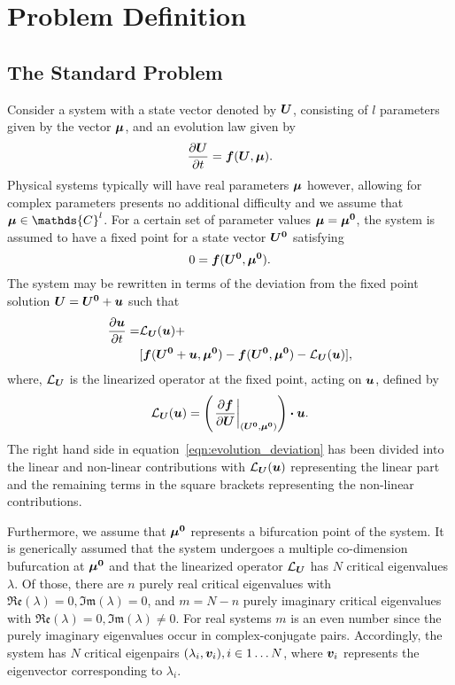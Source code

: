 \section{Problem Definition}
\label{sec:problem_setup}

\subsection{The Standard Problem}
\label{sec:standard}

Consider a system with a state vector denoted by $\boldsymbol{U}$, consisting of $l$ parameters given by the vector $\boldsymbol{\mu}$, and an evolution law given by 
\begin{equation}
	\frac{\partial \boldsymbol{U}}{\partial t} = \boldsymbol{f}(\boldsymbol{U},\boldsymbol{\mu}).
	\label{eqn:evolution0}
\end{equation}
Physical systems typically will have real parameters $\boldsymbol{\mu}$ however, allowing for complex parameters presents no additional difficulty and we assume that $\vecmu \in \mathds{C}^{l}$. 
For a certain set of parameter values $\boldsymbol{\mu} = \boldsymbol{\mu^{0}}$, the system is assumed to have a fixed point for a state vector $\boldsymbol{U^{0}}$ satisfying
\begin{equation}
	0 = \boldsymbol{f}(\boldsymbol{U^{0}},\boldsymbol{\mu^{0}}).
	\label{eqn:fixed_point}
\end{equation}
The system may be rewritten in terms of the deviation from the fixed point solution $\boldsymbol{U} =  \boldsymbol{U^{0}} + \boldsymbol{u}$ such that 
\begin{equation}
	\begin{split}
		\frac{\partial \boldsymbol{u}}{\partial t} =& \mathcal{L}_{\boldsymbol{U}}(\boldsymbol{u}) + \\
		& [\boldsymbol{f}(\boldsymbol{U^{0}} + \boldsymbol{u},\boldsymbol{\mu^{0}}) - \boldsymbol{f}(\boldsymbol{U^{0}},\boldsymbol{\mu^{0}}) - \mathcal{L}_{\boldsymbol{U}}(\boldsymbol{u})],
	\end{split}
	\label{eqn:evolution_deviation}
\end{equation}
where, $\mathcal{L}_{\boldsymbol{U}}$ is the linearized operator at the fixed point, acting on $\boldsymbol{u}$, defined by
\begin{equation}
	\mathcal{L}_{\boldsymbol{U}}(\boldsymbol{u}) = \left(\left.\frac{\partial \boldsymbol{f}}{\partial \boldsymbol{U}}\right|_{(\boldsymbol{U^{0}},\boldsymbol{\mu^{0}})} \right)\boldsymbol{\cdot} \boldsymbol{u}.
	\label{eqn:linearized_operator_u}
\end{equation}
The right hand side in equation~\eqref{eqn:evolution_deviation} has been divided into the linear and non-linear contributions with $\mathcal{L}_{\boldsymbol{U}}(\boldsymbol{u})$ representing the linear part and the remaining terms in the square brackets representing the non-linear contributions.

Furthermore, we assume that $\boldsymbol{\mu^{0}}$ represents a bifurcation point of the system. It is generically assumed that the system undergoes a multiple co-dimension bufurcation at $\boldsymbol{\mu^{0}}$ and that the linearized operator $\mathcal{L}_{\boldsymbol{U}}$ has $N$ critical eigenvalues $\lambda$. Of those, there are 
$n$ purely real critical eigenvalues with $\mathfrak{Re}(\lambda) = 0, \mathfrak{Im}(\lambda) = 0$, and $m = N - n$ purely imaginary critical eigenvalues with $\mathfrak{Re}(\lambda) = 0, \mathfrak{Im}(\lambda) \ne 0$. For real systems $m$ is an even number since the purely imaginary eigenvalues occur in complex-conjugate pairs. Accordingly, the system has $N$ critical eigenpairs $(\lambda_{i},\boldsymbol{v}_{i}), i\in 1\ldots N$, where $\boldsymbol{v}_{i}$ represents the eigenvector corresponding to $\lambda_{i}$. 

